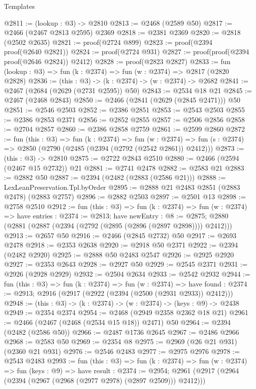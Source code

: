 \begin{lexlean}{Templates}
\begin{coremodule}
@2811 := (lookup : @3) -> @2810
@2813 := @2468 (@2589 @50)
@2817 := @2466 (@2467 @2813 @2595) @2369
@2818 := @2381 @2369
@2820 := @2818 (@2502 @2635)
@2821 := proof(@2724 @899)
@2823 := proof(@2394 proof(@2640 @2821))
@2824 := proof(@2724 @931)
@2827 := proof(proof(@2394 proof(@2646 @2824)) @2412)
@2828 := proof(@2823 @2827)
@2833 := fun (lookup : @3) => fun (k : @2374) => fun (w : @2374) => @2817 (@2820 @2828)
@2836 := (this : @3) -> (k : @2374) -> (w : @2374) -> @2682
@2841 := @2467 (@2684 (@2629 (@2731 @2595)) @50)
@2843 := @2534 @18 @21
@2845 := @2467 (@2468 @2843)
@2850 := @2466 (@2841 (@2629 (@2845 @2471))) @50
@2851 := @2546 @2503
@2852 := @2386 @2851
@2853 := @2543 @2503
@2855 := @2386 @2853 @2371
@2856 := @2852 @2855
@2857 := @2506 @2856
@2858 := @2704 @2857
@2860 := @2386 @2858 @2759
@2861 := @2599 @2860
@2872 := fun (this : @3) =>
  fun (k : @2374) =>
  fun (w : @2374) => fun (s : @2374) => @2850 (@2790 (@2485 (@2394 (@2792 (@2542 @2861)) @2412)))
@2873 := (this : @3) -> @2810
@2875 := @2722 @2843 @2510
@2880 := @2466 (@2594 (@2467 @15 @2732)) @21
@2881 := @2741 @2478
@2882 := @2583 @21
@2883 := @2882 @50
@2887 := @2394 (@2482 (@2883 (@2586 @21)))
@2888 := LexLeanPreservation.Tpl.byOrder
@2895 := @2888 @21 @2483 @2851 (@2883 @2478) (@2883 @2757)
@2896 := @2882 @2503
@2897 := @2501 @13
@2898 := @2758 @2510
@2912 := fun (this : @3) =>
  fun (k : @2374) =>
  fun (w : @2374) =>
  have entries : @2374 := @2813;
  have newEntry : @8 := @2875;
  @2880 (@2881 (@2887 (@2394 (@2792 (@2895 (@2896 (@2897 @2898)))) @2412)))
@2913 := @2657 @50
@2916 := @2466 (@2845 @2732) @50
@2917 := @2693 @2478
@2918 := @2353 @2638
@2920 := @2918 @50 @2371
@2922 := @2394 (@2482 @2920)
@2925 := @2888 @50 @2483 @2547
@2926 := @2925 @2920
@2927 := @2353 @2643
@2928 := @2927 @50
@2929 := @2545 @2371
@2931 := @2926 (@2928 @2929)
@2932 := @2504 @2634
@2933 := @2542 @2932
@2944 := fun (this : @3) =>
  fun (k : @2374) =>
  fun (w : @2374) =>
  have found : @2374 := @2913; @2916 (@2917 (@2922 (@2394 (@2500 (@2931 @2933)) @2412)))
@2948 := (this : @3) -> (k : @2374) -> (w : @2374) -> (keys : @9) -> @2438
@2949 := @2354 @2374
@2954 := @2468 (@2949 @2358 @2362 @18 @21)
@2961 := @2466 (@2467 (@2468 (@2534 @15 @18)) @2471) @50
@2964 := @2394 (@2482 (@2586 @50))
@2966 := @2487 @1736 @2645
@2967 := @2486 @2966
@2968 := @2583 @50
@2969 := @2354 @8
@2975 := @2969 (@26 @21 @931) (@2360 @21 @931)
@2976 := @2546 @2483
@2977 := @2975 @2976
@2978 := @2543 @2483
@2993 := fun (this : @3) =>
  fun (k : @2374) =>
  fun (w : @2374) =>
  fun (keys : @9) =>
  have result : @2374 := @2954;
  @2961 (@2917 (@2964 (@2394 (@2967 (@2968 (@2977 @2978) (@2897 @2509))) @2412)))

\end{coremodule}
\end{lexlean}

